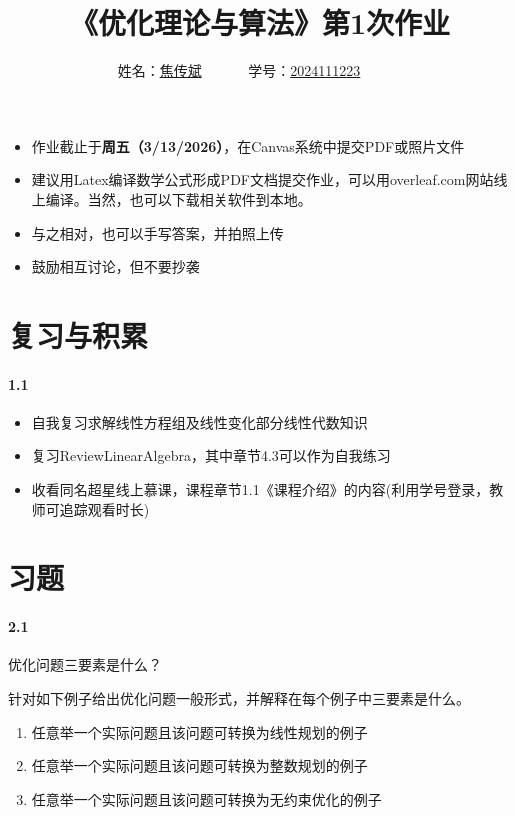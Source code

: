 \documentclass[12pt,a4paper]{article}
\begin{document}
\title{\bf《优化理论与算法》第1次作业}


 \author{
姓名：\underline{焦传斌}~~~~~~
学号：\underline{2024111223}~~~~~~}

\maketitle
	\begin{itemize}
		\item 作业截止于{\bf 周五（3/13/2026）}，在Canvas系统中提交PDF或照片文件
		\item 建议用Latex编译数学公式形成PDF文档提交作业，可以用overleaf.com网站线上编译。当然，也可以下载相关软件到本地。
		\item 与之相对，也可以手写答案，并拍照上传
		\item 鼓励相互讨论，但不要抄袭
	\end{itemize}
	
\section{复习与积累}
	\paragraph{1.1}
	\begin{itemize}
		\item 自我复习求解线性方程组及线性变化部分线性代数知识
		\item 复习ReviewLinearAlgebra，其中章节4.3可以作为自我练习
		\item 收看同名超星线上慕课，课程章节1.1《课程介绍》的内容(利用学号登录，教师可追踪观看时长)
	\end{itemize}
	
	
\section{习题}
	
	\paragraph{2.1}
	优化问题三要素是什么？
	
	针对如下例子给出优化问题一般形式，并解释在每个例子中三要素是什么。
	\begin{enumerate}
		\item 任意举一个实际问题且该问题可转换为线性规划的例子
		\item 任意举一个实际问题且该问题可转换为整数规划的例子
		\item 任意举一个实际问题且该问题可转换为无约束优化的例子
	\end{enumerate}
	
\end{document}
